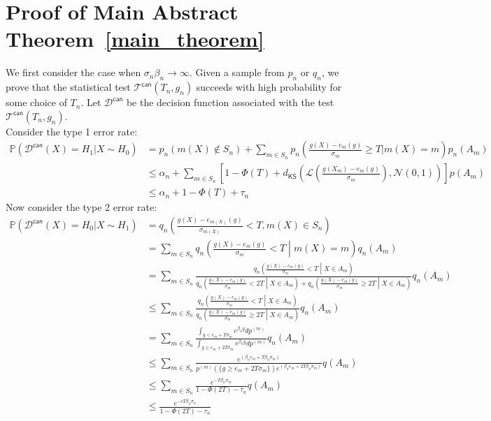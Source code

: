 \documentclass[final,12pt]{colt2018}
\begin{document}
%

\appendix


\newpage 

\section{Proof of Main Abstract Theorem~\ref{main_theorem}}
\label{sec: main_theorem_proof}

We first consider the case when $\sigma_n \beta_n \to \infty$.
Given a sample from $p_n$ or $q_n$, we prove that the statistical test $\mathcal{T}^{\mathsf{can}}(T_n,g_n)$ succeeds with high probability for some choice of $T_n$. Let $\mathcal{D}^{\mathsf{can}}$ be the decision function associated with the test $\mathcal{T}^{\mathsf{can}}(T_n,g_n)$.\\Consider the type 1 error rate:
\begin{align}
\mathbb{P}\left(\mathcal{D}^{\mathsf{can}}(X) = H_1 | X \sim H_0\right) &= p_n\left(m(X) \notin S_n\right) +\sum_{m\in S_n} p_n \left(\frac{g(X)- e_{m}(g)}{\sigma_{m}} \geq T \biggr \rvert m(X) = m\right)p_n\left(A_m\right) \nonumber \\
&\leq \alpha_n + \sum_{m \in S_n}\left[1-\Phi(T) + d_{\mathsf{KS}}\left(\mathcal{L}\left(\tfrac{g(X_m) - e_m(g)}{\sigma_m}\right),\mathcal{N}(0,1)\right) \right]p\left(A_m\right) \nonumber \\
&\leq \alpha_n + 1-\Phi(T) + \tau_n \label{type_1_error}
\end{align}
Now consider the type 2 error rate:
\begin{align}
\mathbb{P}\left(\mathcal{D}^{\mathsf{can}}(X) = H_0| X \sim H_1 \right) &= q_n\left(\frac{g(X)- e_{m(X)}(g)}{\sigma_{m(X)}} < T,m(X) \in S_n\right)\nonumber\\
&= \sum_{m \in S_n} q_n\left(\frac{g(X)- e_{m}(g)}{\sigma_{m}} < T\middle| m(X) = m\right) q_n\left(A_m\right)\nonumber\\
&= \sum_{m \in S_n} \tfrac{q_n\left(\frac{g(X)- e_{m}(g)}{\sigma_{m}} < T\middle| X\in A_m\right)}{q_n\left(\frac{g(X)- e_{m}(g)}{\sigma_{m}} < 2T\middle| X\in A_m\right)+q_n\left(\frac{g(X)- e_{m}(g)}{\sigma_{m}} \geq2 T\middle| X\in A_m\right)} q_n\left(A_m\right)\nonumber\\
&\leq  \sum_{m \in S_n} \tfrac{q_n\left(\frac{g(X)- e_{m}(g)}{\sigma_{m}} < T\middle| X\in A_m\right)}{q_n\left(\frac{g(X)- e_{m}(g)}{\sigma_{m}} \geq 2T\middle| X\in A_m\right)} q_n\left(A_m\right)\nonumber\\
&= \sum_{m \in S_n} \tfrac{\int_{g < e_m + T\sigma_m } e^{\beta_n g} dp^{(m)}}{\int_{g \geq e_m + 2T\sigma_m } e^{\beta_n g} dp^{(m)}} q_n\left(A_m\right)\nonumber \\
&\leq \sum_{m \in S_n} \tfrac{ e^{\left(\beta_n e_m + T\beta_n\sigma_m\right)} }{p^{(m)}\left(\{g \geq e_m + 2T\sigma_m\}\right)e^{\left(\beta_n e_m + 2T\beta_n\sigma_m\right)}} q\left(A_m\right)\nonumber \\
&\leq  \sum_{m \in S_n} \tfrac{e^{-T\beta_n\sigma_m }}{1-\Phi(2T) - \tau_n}q\left(A_m\right) \nonumber \\
&\leq \tfrac{e^{-cT\beta_n\sigma_n }}{1-\Phi(2T) - \tau_n} \label{type_2_error}
\end{align}
\end{document}
